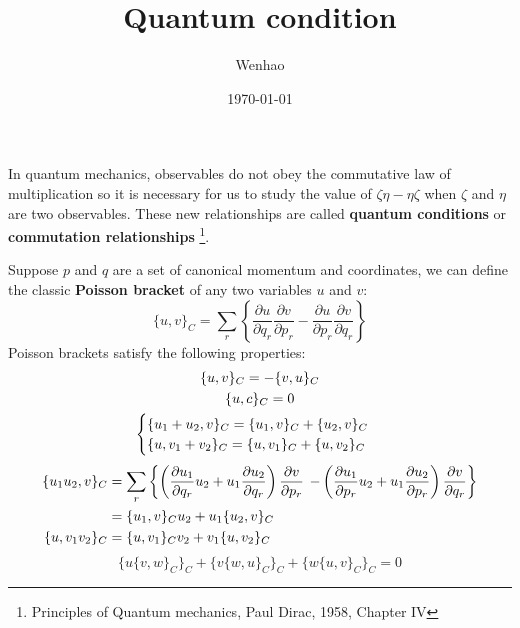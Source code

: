 \documentclass{article}
\begin{document}
\title{Quantum condition}
\author{Wenhao}
\date{\today}
\maketitle
In quantum mechanics, observables do not obey the commutative law of multiplication so
it is necessary for us to study the value of $\zeta\eta - \eta\zeta$ when $\zeta$ and $\eta$
are two observables. These new relationships are called \textbf{quantum conditions} or
\textbf{commutation relationships} 
\footnote{Principles of Quantum mechanics, Paul Dirac, 1958, Chapter IV}.

Suppose $p$ and $q$ are a set of canonical momentum and coordinates, we can define the classic
\textbf{Poisson bracket} of any two variables $u$ and $v$:
\begin{equation}
    \{ u,v \}_C = \sum_r \left\{ \frac{\partial u}{\partial q_r}\frac{\partial v}{\partial p_r} - \frac{\partial u}{\partial p_r}\frac{\partial v}{\partial q_r} \right\}
\end{equation}
Poisson brackets satisfy the following properties:
\begin{gather}
    \{u,v\}_C = - \{v,u\}_C \\
    \{u,c\}_C = 0 \\
    \begin{cases}
        \{ u_1 + u_2, v\}_C = \{ u_1, v\}_C + \{u_2,v\}_C \notag \\
        \{ u, v_1 + v_2\}_C = \{ u, v_1\}_C + \{u,v_2\}_C 
    \end{cases}
\end{gather}
\begin{align}
    \{u_1u_2,v\}_C 
    &= \sum_r \left\{ \left( \frac{\partial u_1}{\partial q_r} u_2 + u_1\frac{\partial u_2}{\partial q_r}\right)\frac{\partial v}{\partial p_r} \right. 
                \left.- \left( \frac{\partial u_1}{\partial p_r} u_2 + u_1\frac{\partial u_2}{\partial p_r}\right)\frac{\partial v}{\partial q_r} \right\} \notag \\
    &= \{u_1,v\}_C u_2 + u_1 \{ u_2,v \}_C \notag \\
    \{u,v_1v_2\}_C &= \{u,v_1\}_C v_2 + v_1 \{ u,v_2 \}_C
\end{align}
\begin{equation}
    \{u \{v,w\}_C\}_C + \{v \{w,u\}_C\}_C + \{w \{u,v\}_C\}_C = 0
\end{equation}
\end{document}
